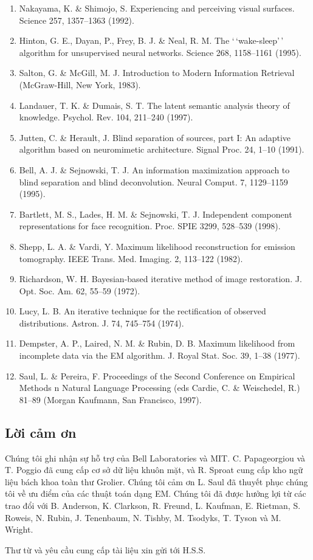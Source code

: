 \begin{enumerate}
\item
  Nakayama, K. \& Shimojo, S. Experiencing and perceiving visual surfaces. Science 257, 1357--1363 (1992).
\item
  Hinton, G. E., Dayan, P., Frey, B. J. \& Neal, R. M. The `\,`wake-sleep'\,' algorithm for unsupervised neural networks. Science 268, 1158--1161 (1995).
\item
  Salton, G. \& McGill, M. J. Introduction to Modern Information Retrieval (McGraw-Hill, New York, 1983).
\item
  Landauer, T. K. \& Dumais, S. T. The latent semantic analysis theory of knowledge. Psychol. Rev. 104, 211--240 (1997).
\item
  Jutten, C. \& Herault, J. Blind separation of sources, part I: An adaptive algorithm based on neuromimetic architecture. Signal Proc. 24, 1--10 (1991).
\item
  Bell, A. J. \& Sejnowski, T. J. An information maximization approach to blind separation and blind deconvolution. Neural Comput. 7, 1129--1159 (1995).
\item
  Bartlett, M. S., Lades, H. M. \& Sejnowski, T. J. Independent component representations for face recognition. Proc. SPIE 3299, 528--539 (1998).
\item
  Shepp, L. A. \& Vardi, Y. Maximum likelihood reconstruction for emission tomography. IEEE Trans. Med. Imaging. 2, 113--122 (1982).
\item
  Richardson, W. H. Bayesian-based iterative method of image restoration. J. Opt. Soc. Am. 62, 55--59 (1972).
\item
  Lucy, L. B. An iterative technique for the rectification of observed distributions. Astron. J. 74, 745--754 (1974).
\item
  Dempster, A. P., Laired, N. M. \& Rubin, D. B. Maximum likelihood from incomplete data via the EM algorithm. J. Royal Stat. Soc. 39, 1--38 (1977).
\item
  Saul, L. \& Pereira, F. Proceedings of the Second Conference on Empirical Methods n Natural Language Processing (eds Cardie, C. \& Weischedel, R.) 81--89 (Morgan Kaufmann, San Francisco, 1997).
\end{enumerate}

\subsection{Lời cảm ơn}

Chúng tôi ghi nhận sự hỗ trợ của Bell Laboratories và MIT. C. Papageorgiou và T. Poggio đã cung cấp cơ sở dữ liệu khuôn mặt, và R. Sproat cung cấp kho ngữ liệu bách khoa toàn thư Grolier. Chúng tôi cảm ơn L. Saul đã thuyết phục chúng tôi về ưu điểm của các thuật toán dạng EM. Chúng tôi đã được hưởng lợi từ các trao đổi với B. Anderson, K. Clarkson, R. Freund, L. Kaufman, E. Rietman, S. Roweis, N. Rubin, J. Tenenbaum, N. Tishby, M. Tsodyks, T. Tyson và M. Wright.

Thư từ và yêu cầu cung cấp tài liệu xin gửi tới H.S.S.
